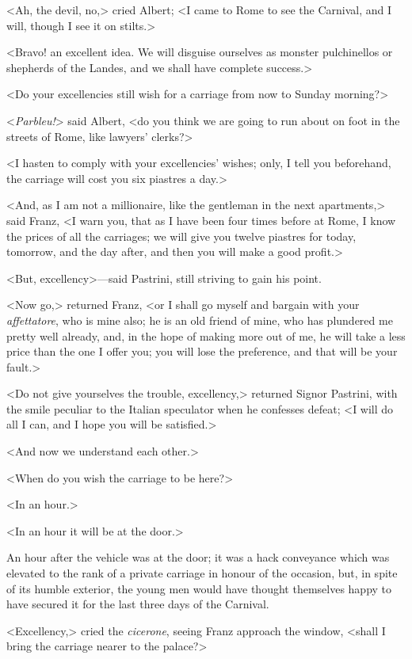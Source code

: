  <Ah, the devil, no,> cried Albert; <I came to Rome to see the Carnival, and I will, though I see it on stilts.> 

 <Bravo! an excellent idea. We will disguise ourselves as monster pulchinellos or shepherds of the Landes, and we shall have complete success.> 

 <Do your excellencies still wish for a carriage from now to Sunday morning?> 

 <\textit{Parbleu!}> said Albert, <do you think we are going to run about on foot in the streets of Rome, like lawyers' clerks?> 

 <I hasten to comply with your excellencies' wishes; only, I tell you beforehand, the carriage will cost you six piastres a day.> 

 <And, as I am not a millionaire, like the gentleman in the next apartments,> said Franz, <I warn you, that as I have been four times before at Rome, I know the prices of all the carriages; we will give you twelve piastres for today, tomorrow, and the day after, and then you will make a good profit.> 

 <But, excellency>—said Pastrini, still striving to gain his point. 

 <Now go,> returned Franz, <or I shall go myself and bargain with your \textit{affettatore}, who is mine also; he is an old friend of mine, who has plundered me pretty well already, and, in the hope of making more out of me, he will take a less price than the one I offer you; you will lose the preference, and that will be your fault.> 

 <Do not give yourselves the trouble, excellency,> returned Signor Pastrini, with the smile peculiar to the Italian speculator when he confesses defeat; <I will do all I can, and I hope you will be satisfied.> 

 <And now we understand each other.> 

 <When do you wish the carriage to be here?> 

 <In an hour.> 

 <In an hour it will be at the door.> 

 An hour after the vehicle was at the door; it was a hack conveyance which was elevated to the rank of a private carriage in honour of the occasion, but, in spite of its humble exterior, the young men would have thought themselves happy to have secured it for the last three days of the Carnival. 

 <Excellency,> cried the \textit{cicerone}, seeing Franz approach the window, <shall I bring the carriage nearer to the palace?> 

